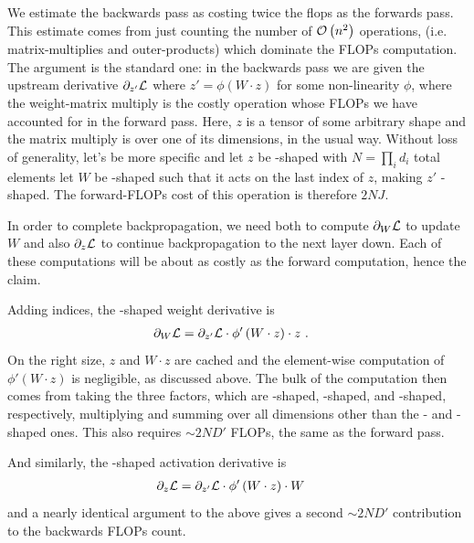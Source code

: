 \documentclass[11pt]{article}
\begin{document}
We estimate the backwards pass as costing twice the flops as the forwards pass. This estimate comes
from just counting the number of $ \mathcal{O} \left( n ^{ 2 } \right)  $ operations, (i.e.
matrix-multiplies and outer-products) which dominate the FLOPs computation.  The argument is the
standard one: in the backwards pass we are given the upstream derivative $ \partial _{ z '  } \mathcal{L}
$ where $ z' = \phi \left ( W \cdot z \right ) $ for some non-linearity $ \phi $, where the
weight-matrix multiply is the costly operation whose FLOPs we have accounted for in the forward
pass. Here, $ z $ is a tensor of some arbitrary shape and the matrix multiply is over one of its
dimensions, in the usual way. Without loss of generality, let's be more specific and let $ z $ be
-shaped with $N= \prod _{ i } d_{i  } $ total elements let $ W $ be
-shaped such that it acts on the last index of $ z $, making $ z' $
-shaped. The forward-FLOPs cost of this operation is therefore $ 2NJ $.

In order to complete backpropagation, we need both to compute $ \partial  _{ W }\mathcal{L}  $ to update $
W $ and also $ \partial  _{ z } \mathcal{L}  $ to continue backpropagation to the next layer down. Each of
these computations will be about as costly as the forward computation, hence the claim.

Adding indices, the -shaped weight derivative is
\begin{align}
    \partial  _{ W }\mathcal{L}  &= \partial _{ z '  } \mathcal{L} \cdot \phi' \left ( W \cdot z \right ) \cdot
z\ .
\end{align}
On the right size, $ z $ and $ W \cdot  z $ are cached and the element-wise computation of $ \phi'
\left ( W \cdot z \right ) $ is negligible, as discussed above. The bulk of the computation then comes from
taking the three factors, which are -shaped,
-shaped, and -shaped, respectively,
multiplying and summing over all dimensions other than the -  and -shaped
ones. This also requires $ \sim 2ND' $ FLOPs, the same as the forward pass.


And similarly, the -shaped activation derivative is
\begin{align}
    \partial  _{ z }\mathcal{L}  &= \partial _{ z '  } \mathcal{L} \cdot \phi' \left ( W \cdot z \right )  \cdot  W
\end{align}
and a nearly identical argument to the above gives a second $ \sim  2ND'  $ contribution to the
backwards FLOPs count.
\end{document}
